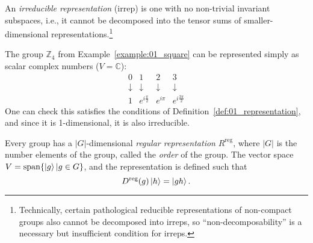 \begin{definition}
\label{def:01_irreps}
An \textit{irreducible representation} (irrep) is one with no non-trivial invariant subspaces, i.e., it cannot be decomposed into the tensor sums of smaller-dimensional representations.\footnote{Technically, certain pathological reducible representations of non-compact groups also cannot be decomposed into irreps, so ``non-decomposability'' is a necessary but insufficient condition for irreps.}
\end{definition}

\begin{example}
\label{example:01_square_representation}
The group $\mathbb Z_4$ from Example~\ref{example:01_square} can be represented simply as scalar complex numbers ($V = \mathbb C$):
\begin{equation}
	\label{eq:01_z4_representation}
	\begin{array}{cccc}
	0 & 1 & 2 & 3 \\
	\downarrow & \downarrow & \downarrow & \downarrow \\
	1 & e^{i\frac{\pi}{2}} & e^{i\pi} & e^{i\frac{3\pi}{2}}
	\end{array}
\end{equation}
One can check this satisfies the conditions of Definition~\ref{def:01_representation}, and since it is 1-dimensional, it is also irreducible.
\end{example}

\begin{definition}
\label{def:01_symmetry_regular_representation}
Every group has a $|G|$-dimensional \textit{regular representation} $R^{\mathrm{reg}}$, where $|G|$ is the number elements of the group, called the \textit{order} of the group.
The vector space $V = \mathrm{span}\{\ket{g}|g\in G\}$, and the representation is defined such that
\begin{equation}
	\label{eq:01_regular_representation}
	D^{\mathrm{reg}}(g)\ket{h} = \ket{gh}.
\end{equation}
\end{definition}

